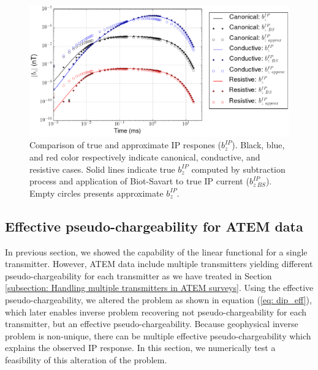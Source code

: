 \documentclass[a4paper, 11pt]{article}
\begin{document}
\begin{figure}[htb]
  \centering
  \includegraphics[width=1\textwidth]{figures/True_vs_approx_IPresp.png}
  \caption{Comparison of true and approximate IP respones ($b_z^{IP}$). Black, blue, and red color respectively indicate canonical, conductive, and resistive cases. Solid lines indicate true $b_z^{IP}$ computed by subtraction process and application of Biot-Savart to true IP current ($b_{z \ BS}^{IP}$). Empty circles presents approximate $b_z^{IP}$. }
  \label{F:True_vs_approx_IPresp}
\end{figure}
\clearpage

\subsection{Effective pseudo-chargeability for ATEM data}
\label{subsection: Effective pseudo-chargeability for ATEM data}
In previous section, we showed the capability of the linear functional for a single transmitter. 
However, ATEM data include multiple transmitters yielding different pseudo-chargeability for each transmitter as we have treated in Section \ref{subsection: Handling multiple transmitters in ATEM surveys}. 
Using the effective pseudo-chargeability, we altered the problem as shown in equation (\ref{eq: dip_eff}), which later enables inverse problem recovering not pseudo-chargeability for each transmitter, but an effective pseudo-chargeability. 
Because geophysical inverse problem is non-unique, there can be multiple effective pseudo-chargeability which explains the observed IP response. 
In this section, we numerically test a feasibility of this alteration of the problem. 
\end{document}
